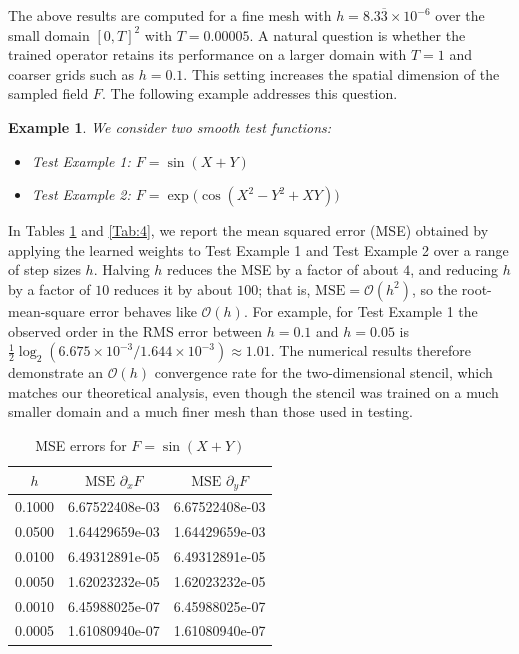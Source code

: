 \documentclass[pdflatex,sn-mathphys-num]{sn-jnl}%
\theoremstyle{thmstyleone}%
\theoremstyle{thmstyletwo}%
\newtheorem{example}{Example}%
\theoremstyle{thmstylethree}%
\begin{document}
{The above results are computed for a fine mesh with $h={8.3\overline{3}\times 10^{-6}}$ over the small domain $[0,T]^2$ with $T=0.00005$. A natural question is whether the trained operator retains its performance on a larger domain with $T=1$ and coarser grids such as $h=0.1$. This setting increases the spatial dimension of the sampled field $F$. The following example addresses this question.
\begin{example}
We consider two smooth test functions:
\begin{itemize}
    \item Test Example 1: $F=\sin(X+Y)$
    \item Test Example 2: $F = \exp\big(\cos\left(X^2 - Y^2 + XY\right)\big)$
\end{itemize}
\end{example}

In Tables \ref{Tab:3} and \ref{Tab:4}, we report the mean squared error (MSE) obtained by applying the learned weights to Test Example 1 and Test Example 2 over a range of step sizes $h$. Halving $h$ reduces the MSE by a factor of about $4$, and reducing $h$ by a factor of $10$ reduces it by about $100$; that is, $\mathrm{MSE}=\mathcal{O}(h^2)$, so the root-mean-square error behaves like $\mathcal{O}(h)$. For example, for Test Example 1 the observed order in the RMS error between $h=0.1$ and $h=0.05$ is $\tfrac12\log_2(6.675\times10^{-3}/1.644\times10^{-3})\approx 1.01$. The numerical results therefore demonstrate an $\mathcal{O}(h)$ convergence rate for the two-dimensional stencil, which matches our theoretical analysis, even though the stencil was trained on a much smaller domain and a much finer mesh than those used in testing.

\begin{table}[htbp]
\centering
\caption{MSE errors for $F=\sin(X+Y)$}
\label{Tab:3}
\begin{tabular}{ccc}
$h$ & $\text{MSE } \partial_x F$ & $\text{MSE } \partial_y F$ \\
\hline
0.1000 & 6.67522408e-03 & 6.67522408e-03 \\
0.0500 & 1.64429659e-03 & 1.64429659e-03 \\
0.0100 & 6.49312891e-05 & 6.49312891e-05 \\
0.0050 & 1.62023232e-05 & 1.62023232e-05 \\
0.0010 & 6.45988025e-07 & 6.45988025e-07 \\
0.0005 & 1.61080940e-07 & 1.61080940e-07 \\
\end{tabular}
\end{table}

}
\end{document}
